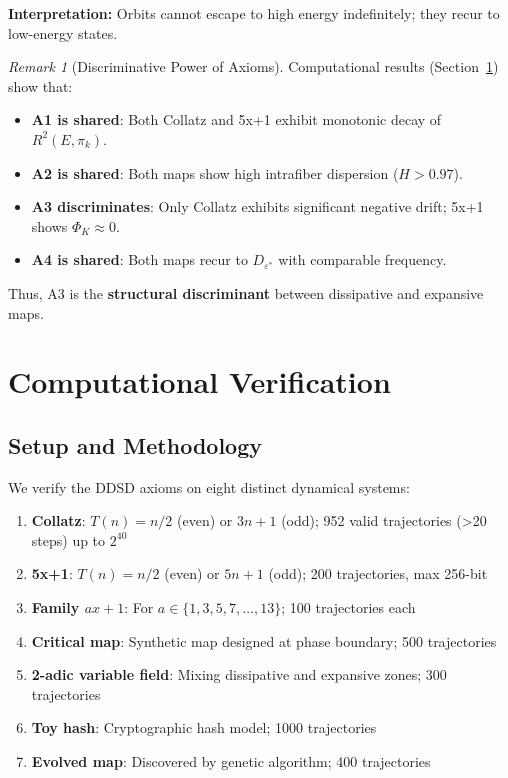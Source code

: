 \documentclass[11pt,a4paper]{article}
\theoremstyle{plain}
\theoremstyle{definition}
\theoremstyle{remark}
\newtheorem{remark}[theorem]{Remark}
\begin{document}
\textbf{Interpretation:} Orbits cannot escape to high energy indefinitely; they recur to low-energy states.

\begin{remark}[Discriminative Power of Axioms]
\label{rem:discriminant}
Computational results (Section~\ref{sec:verification}) show that:
\begin{itemize}
    \item \textbf{A1 is shared}: Both Collatz and 5x+1 exhibit monotonic decay of $R^2(E, \pi_k)$.
    \item \textbf{A2 is shared}: Both maps show high intrafiber dispersion ($H > 0.97$).
    \item \textbf{A3 discriminates}: Only Collatz exhibits significant negative drift; 5x+1 shows $\Phi_K \approx 0$.
    \item \textbf{A4 is shared}: Both maps recur to $D_{\varepsilon^*}$ with comparable frequency.
\end{itemize}
Thus, A3 is the \textbf{structural discriminant} between dissipative and expansive maps.
\end{remark}

\section{Computational Verification}
\label{sec:verification}

\subsection{Setup and Methodology}

We verify the DDSD axioms on eight distinct dynamical systems:

\begin{enumerate}
    \item \textbf{Collatz}: $T(n) = n/2$ (even) or $3n+1$ (odd); 952 valid trajectories (>20 steps) up to $2^{40}$
    \item \textbf{5x+1}: $T(n) = n/2$ (even) or $5n+1$ (odd); 200 trajectories, max 256-bit
    \item \textbf{Family $ax+1$}: For $a \in \{1,3,5,7,\ldots,13\}$; 100 trajectories each
    \item \textbf{Critical map}: Synthetic map designed at phase boundary; 500 trajectories
    \item \textbf{2-adic variable field}: Mixing dissipative and expansive zones; 300 trajectories
    \item \textbf{Toy hash}: Cryptographic hash model; 1000 trajectories
    \item \textbf{Evolved map}: Discovered by genetic algorithm; 400 trajectories
\end{enumerate}
\end{document}

